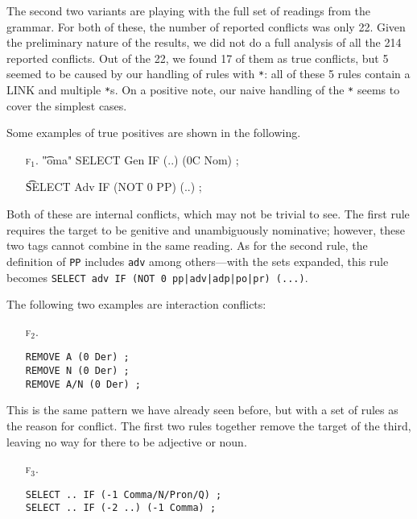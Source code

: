{{The second two variants are playing with the full set of readings from the grammar. For both of these, the number of reported conflicts was only 22.
Given the preliminary nature of the results, we did not do a full analysis of all the 214 reported conflicts.
Out of the 22, we found 17 of them as true conflicts,
 but 5 seemed to be caused by our handling of rules with \verb!*!: all of these 5 rules contain a LINK and multiple \verb!*!s. On a positive note, our naive handling of the \verb!*! seems to cover the simplest cases.





Some examples of true positives are shown in the following.


\begin{itemize}
\item[\textsc{f$_1$}.]\t{"oma" SELECT Gen IF (..) (0C Nom) ;}

\item[] \t{SELECT Adv IF (NOT 0 PP) (..) ;}
\end{itemize}

Both of these are internal conflicts, which may not be trivial to see.
The first rule requires the target to be genitive and unambiguously nominative; however, these two tags cannot combine in the same reading.
As for the second rule, the definition of \texttt{PP} includes \texttt{adv} among others---with the sets expanded, this rule becomes \texttt{SELECT adv IF (NOT 0 pp|adv|adp|po|pr) (...)}.

The following two examples are interaction conflicts:

\begin{itemize}
\item[\textsc{f$_2$}.]\begin{verbatim}
REMOVE A (0 Der) ; 
REMOVE N (0 Der) ; 
REMOVE A/N (0 Der) ; 
\end{verbatim}
\end{itemize}

This is the same pattern we have already seen before, but with a set of rules as the reason for conflict.
The first two rules together remove the target of the third, leaving no way for there to be adjective or noun.

\begin{itemize}
\item[\textsc{f$_3$.}]\begin{verbatim}
SELECT .. IF (-1 Comma/N/Pron/Q) ;
SELECT .. IF (-2 ..) (-1 Comma) ;
\end{verbatim}
\end{itemize}

}}
